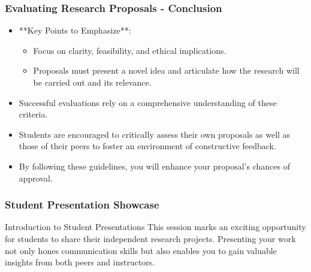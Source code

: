 \documentclass[aspectratio=169]{beamer}
\begin{document}
\begin{frame}[fragile]
    \frametitle{Evaluating Research Proposals - Conclusion}
    \begin{itemize}
        \item **Key Points to Emphasize**:
            \begin{itemize}
                \item Focus on clarity, feasibility, and ethical implications.
                \item Proposals must present a novel idea and articulate how the research will be carried out and its relevance.
            \end{itemize}
        
        \item Successful evaluations rely on a comprehensive understanding of these criteria.
        \item Students are encouraged to critically assess their own proposals as well as those of their peers to foster an environment of constructive feedback.
        
        \item By following these guidelines, you will enhance your proposal's chances of approval.
    \end{itemize}
\end{frame}

\begin{frame}[fragile]
  \frametitle{Student Presentation Showcase}
  \begin{block}{Introduction to Student Presentations}
    This session marks an exciting opportunity for students to share their independent research projects. Presenting your work not only hones communication skills but also enables you to gain valuable insights from both peers and instructors.
  \end{block}
\end{frame}
\end{document}
